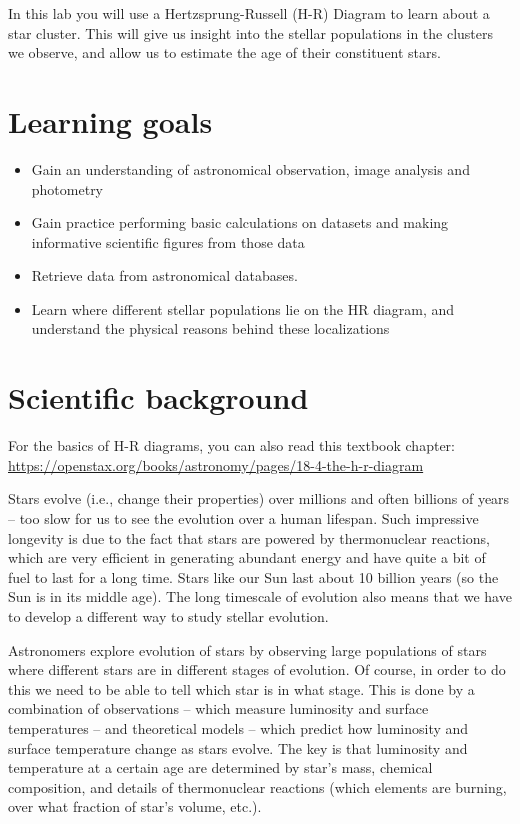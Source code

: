 In this lab you will use a Hertzsprung-Russell (H-R) Diagram to learn about a star cluster. This will give us insight into the stellar populations in the clusters we observe, and allow us to estimate the age of their constituent stars. 

\section{Learning goals}

\begin{itemize}
    \item Gain an understanding of astronomical observation, image analysis and photometry
	\item Gain practice performing basic calculations on datasets and making informative scientific figures from those data
	\item Retrieve data from astronomical databases.
	\item Learn where different stellar populations lie on the HR diagram, and understand the physical reasons behind these localizations
\end{itemize}


\section{Scientific background}


For the basics of H-R diagrams, you can also read this textbook chapter: \url{https://openstax.org/books/astronomy/pages/18-4-the-h-r-diagram}

Stars evolve (i.e., change their properties) over millions and often billions of years – too slow for us to see the evolution over a human lifespan.  Such impressive longevity is due to the fact that stars are powered by thermonuclear reactions, which are very efficient in generating abundant energy and have quite a bit of fuel to last for a long time. Stars like our Sun last about 10 billion years (so the Sun is in its middle age). The long timescale of evolution also means that we have to develop a different way to study stellar evolution. 

Astronomers explore evolution of stars by observing large populations of stars where different stars are in different stages of evolution. Of course, in order to do this we need to be able to tell which star is in what stage. This is done by a combination of observations – which measure luminosity and surface temperatures – and theoretical models – which predict how luminosity and surface temperature change as stars evolve. The key is that luminosity and temperature at a certain age are determined by star's mass, chemical composition, and details of thermonuclear reactions (which elements are burning, over what fraction of star's volume, etc.).

